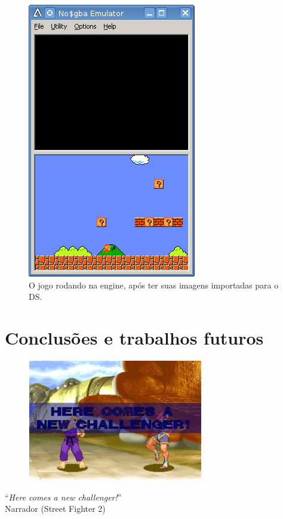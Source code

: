 \documentclass[brazil]{abnt}
\begin{document}
\begin{figure}[h!]
\centering
\includegraphics{imgs/nocash1.png}
\caption{O jogo rodando na engine, após ter suas imagens importadas para o DS.}
\end{figure}


\chapter{Conclusões e trabalhos futuros\label{cap:conclusao}}

\vfill{}
\begin{flushright}{}
\begin{figure}[h!]
\hfill\includegraphics{imgs/streetfighter.jpg}
\end{figure}
``\emph{Here comes a new challenger!}''\\
{\small Narrador (Street Fighter 2)}\end{flushright}{\small \par}
\vfill{}
\end{document}
